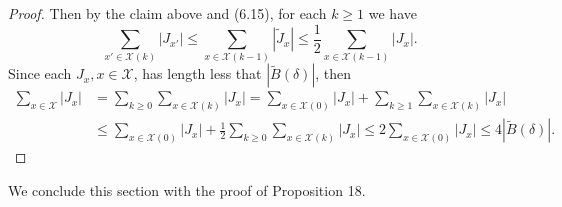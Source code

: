 \documentclass[11pt,oneside]{article}
\theoremstyle{plain}
\numberwithin{equation}{section}
\numberwithin{figure}{section}
\numberwithin{table}{section}
\begin{document}
\begin{proof}
Then by the claim above and (6.15), for each $k \geq 1$ we have
\[
\sum_{x' \in \mathcal X(k)} |J_{x'}| \leq \sum_{x \in \mathcal X(k-1)} |\tilde J_x| \leq \frac{1}{2} \sum_{x \in \mathcal X(k-1)} |J_x|.
\]
Since each $J_x, x \in \mathcal X$, has length less that $|\tilde B(\delta)|$, then 
\begin{align*}
\sum_{x \in \mathcal X} |J_x| & = \sum_{k\geq 0} \sum_{x \in \mathcal X(k)} |J_x| = \sum_{x \in \mathcal X(0)} |J_x| + \sum_{k\geq 1} \sum_{x \in \mathcal X(k)} |J_x| \\
& \leq  \sum_{x \in \mathcal X(0)} |J_x| + \frac{1}{2} \sum_{k\geq 0} \sum_{x \in \mathcal X(k)} |J_x| \leq 2  \sum_{x \in \mathcal X(0)} |J_x|  \leq 4 |\tilde B(\delta)|.
\end{align*}

\end{proof}


We conclude this section with the proof of Proposition 18.
\end{document}
